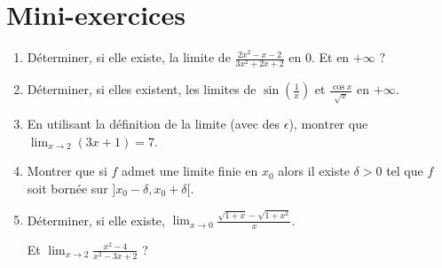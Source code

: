 \section{Mini-exercices}

\begin{frame}

\begin{miniexercice}
\begin{enumerate}
  \item Déterminer, si elle existe, la limite de $\frac{2x^2-x-2}{3x^2+2x+2}$ en $0$. 
  Et en $+\infty$ ?
  
  \item Déterminer, si elles existent, les limites de $\sin\left(\frac1x\right)$ et  $\frac{\cos x}{\sqrt{x}}$ en $+\infty$. 
  
  \item En utilisant la définition de la limite (avec des $\epsilon$), 
  montrer que $\lim_{x\to2} (3x+1) = 7$.
  
  \item Montrer que si $f$ admet une limite finie en $x_0$ alors il existe $\delta>0$ tel que
  $f$ soit bornée sur $]x_0-\delta,x_0+\delta[$.
  
  \item Déterminer, si elle existe,   $\lim_{x\to0} \frac{\sqrt{1+x}-\sqrt{1+x^2}}{x}$. 
  
  Et $\lim_{x\to2} \frac{x^2-4}{x^2-3x+2}$ ?
\end{enumerate}
\end{miniexercice}

\end{frame}

